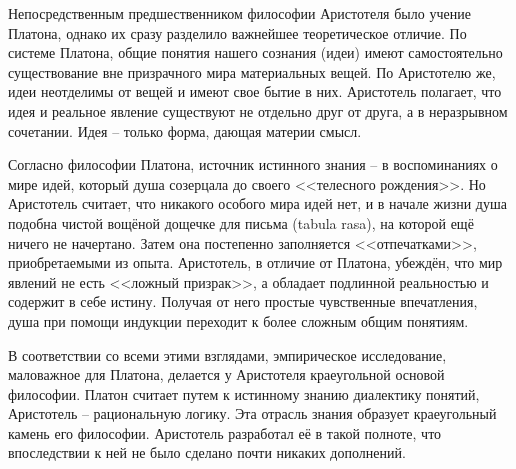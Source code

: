 
Непосредственным предшественником философии Аристотеля было учение Платона, однако их сразу разделило 
важнейшее теоретическое отличие. По системе Платона, общие понятия нашего сознания (идеи) имеют 
самостоятельно существование вне призрачного мира материальных вещей. По Аристотелю же, идеи неотделимы от 
вещей и имеют свое бытие в них. Аристотель полагает, что идея и реальное явление существуют не отдельно друг 
от друга, а в неразрывном сочетании. Идея -- только форма, дающая материи смысл.

Согласно философии Платона, источник истинного знания -- в воспоминаниях о мире идей, который душа созерцала 
до своего <<телесного рождения>>. Но Аристотель считает, что никакого особого мира идей нет, и в начале жизни 
душа подобна чистой вощёной дощечке для письма (tabula rasa), на которой ещё ничего не начертано. Затем она 
постепенно заполняется <<отпечатками>>, приобретаемыми из опыта. Аристотель, в отличие от Платона, убеждён, 
что мир явлений не есть <<ложный призрак>>, а обладает подлинной реальностью и содержит в себе истину. 
Получая от него простые чувственные впечатления, душа при помощи индукции переходит к более сложным общим 
понятиям.

В соответствии со всеми этими взглядами, эмпирическое исследование, маловажное для Платона, делается у 
Аристотеля краеугольной основой философии. Платон считает путем к истинному знанию диалектику понятий, 
Аристотель -- рациональную логику. Эта отрасль знания образует краеугольный камень его философии. Аристотель 
разработал её в такой полноте, что впоследствии к ней не было сделано почти никаких дополнений.

